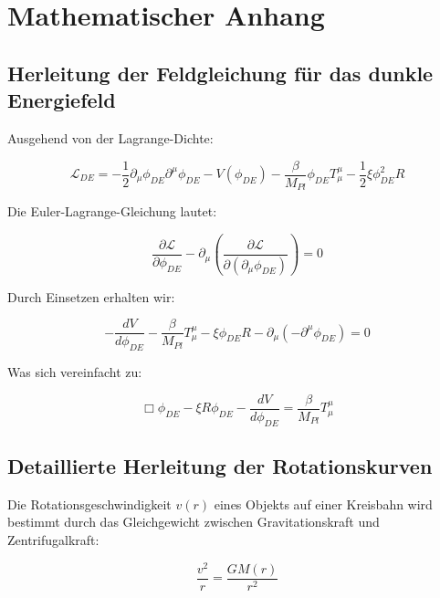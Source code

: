 \documentclass[a4paper,12pt]{article}
\begin{document}
	\appendix
	\section{Mathematischer Anhang}
	
	\subsection{Herleitung der Feldgleichung für das dunkle Energiefeld}
	
	Ausgehend von der Lagrange-Dichte:
	
	\begin{equation}
		\mathcal{L}_{DE} = -\frac{1}{2}\partial_\mu \phi_{DE} \partial^\mu \phi_{DE} - V(\phi_{DE}) - \frac{\beta}{M_{Pl}}\phi_{DE}T^{\mu}_{\mu} - \frac{1}{2}\xi \phi_{DE}^2 R
	\end{equation}
	
	Die Euler-Lagrange-Gleichung lautet:
	
	\begin{equation}
		\frac{\partial \mathcal{L}}{\partial \phi_{DE}} - \partial_\mu \left(\frac{\partial \mathcal{L}}{\partial (\partial_\mu \phi_{DE})}\right) = 0
	\end{equation}
	
	Durch Einsetzen erhalten wir:
	
	\begin{equation}
		-\frac{dV}{d\phi_{DE}} - \frac{\beta}{M_{Pl}}T^{\mu}_{\mu} - \xi \phi_{DE} R - \partial_\mu\left(-\partial^\mu \phi_{DE}\right) = 0
	\end{equation}
	
	Was sich vereinfacht zu:
	
	\begin{equation}
		\Box\phi_{DE} - \xi R \phi_{DE} - \frac{dV}{d\phi_{DE}} = \frac{\beta}{M_{Pl}}T^{\mu}_{\mu}
	\end{equation}
	
	\subsection{Detaillierte Herleitung der Rotationskurven}
	
	Die Rotationsgeschwindigkeit $v(r)$ eines Objekts auf einer Kreisbahn wird bestimmt durch das Gleichgewicht zwischen Gravitationskraft und Zentrifugalkraft:
	
	\begin{equation}
		\frac{v^2}{r} = \frac{GM(r)}{r^2}
	\end{equation}
	
\end{document}
